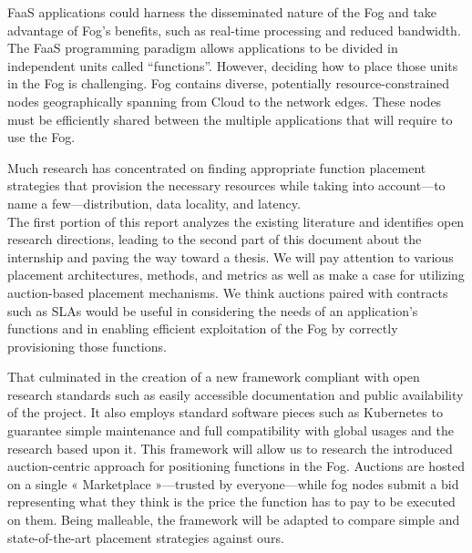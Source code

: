 \Gls{FaaS} applications could harness the disseminated nature of the Fog and take advantage of Fog’s benefits, such as real-time processing and reduced bandwidth. The \gls{FaaS} programming paradigm allows applications to be divided in independent units called “functions”. However, deciding how to place those units in the Fog is challenging. Fog contains diverse, potentially resource-constrained nodes geographically spanning from Cloud to the network edges. These nodes must be efficiently shared between the multiple applications that will require to use the Fog.

Much research has concentrated on finding appropriate function placement strategies that provision the necessary resources while taking into account—to name a few—distribution, data locality, and latency. \\
The first portion of this report analyzes the existing literature and identifies open research directions, leading to the second part of this document about the internship and paving the way toward a thesis. We will pay attention to various placement architectures, methods, and metrics as well as make a case for utilizing auction-based placement mechanisms.
We think auctions paired with contracts such as \glspl{SLA} would be useful in considering the needs of an application’s functions and in enabling efficient exploitation of the Fog by correctly provisioning those functions.

That culminated in the creation of a new framework compliant with open research standards such as easily accessible documentation and public availability of the project. It also employs standard software pieces such as Kubernetes to guarantee simple maintenance and full compatibility with global usages and the research based upon it. This framework will allow us to research the introduced auction-centric approach for positioning functions in the Fog. Auctions are hosted on a single « Marketplace »—trusted by everyone—while fog nodes submit a bid representing what they think is the price the function has to pay to be executed on them. Being malleable, the framework will be adapted to compare simple and state-of-the-art placement strategies against ours.

